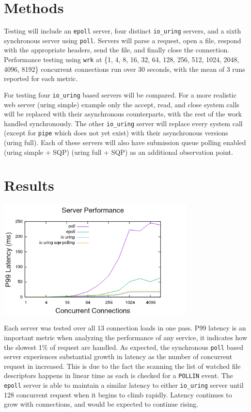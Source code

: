 \documentclass[letterpaper, 10pt, twocolumn]{article}
\begin{document}
\section{Methods}
\label{sec:org08b13f8}
Testing will include an \texttt{epoll} server, four distinct \texttt{io\_uring} servers, and a sixth synchronous server using \texttt{poll}. Servers will parse a request, open a file, respond with the appropriate headers, send the file, and finally close the connection. Performance testing using \texttt{wrk} at \{1, 4, 8, 16, 32, 64, 128, 256, 512, 1024, 2048, 4096, 8192\} concurrent connections run over 30 seconds, with the mean of 3 runs reported for each metric.

For testing four \texttt{io\_uring} based servers will be compared. For a more realistic web server (uring simple) example only the accept, read, and close system calls will be replaced with their asynchronous counterparts, with the rest of the work handled synchronously. The other \texttt{io\_uring} server will replace every system call (except for \texttt{pipe} which does not yet exist) with their asynchronous versions (uring full). Each of these servers will also have submission queue polling enabled (uring simple + SQP) (uring full + SQP) as an additional observation point.

\section{Results}
\label{sec:org617317e}
\begin{center}
\includegraphics[width=10cm]{./p99_latency.png}
\end{center}

Each server was tested over all 13 connection loads in one pass. P99 latency is an important metric when analyzing the performance of any service, it indicates how the slowest 1\% of request are handled. As expected, the synchronous \texttt{poll} based server experiences substantial growth in latency as the number of concurrent request in increased. This is due to the fact the scanning the list of watched file descriptors happens in linear time as each is checked for a \texttt{POLLIN} event. The \texttt{epoll} server is able to maintain a similar latency to either \texttt{io\_uring} server until 128 concurrent request when it begins to climb rapidly. Latency continues to grow with connections, and would be expected to continue rising.
\end{document}
